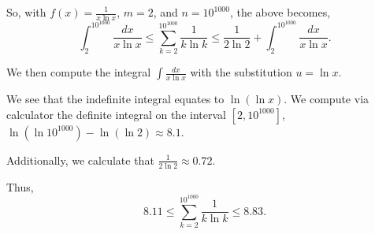 \documentclass[../root file]{subfiles}
\begin{document}
So, with $f(x)=\frac{1}{x\ln{x}}$, $m=2$, and $n=10^{1000}$, the above becomes,
\[\int_{2}^{10^{1000}}\frac{dx}{x\ln{x}}\leq\sum_{k=2}^{10^{1000}}\frac{1}{k\ln{k}}\leq\frac{1}{2\ln{2}}+\int_{2}^{10^{1000}}\frac{dx}{x\ln{x}}.\]

We then compute the integral $\int \frac{dx}{x\ln{x}}$ with the substitution $u=\ln{x}$.

We see that the indefinite integral equates to $\ln{(\ln{x})}$. We compute via calculator the definite integral on the interval $[2,10^{1000}]$, $\ln{\left(\ln{10^{1000}}\right)}-\ln{(\ln{2})}\approx8.1$.

Additionally, we calculate that $\frac{1}{2\ln{2}}\approx0.72$.

Thus, \[8.11\leq\sum_{k=2}^{10^{1000}}\frac{1}{k\ln{k}}\leq8.83.\]
\end{document}
